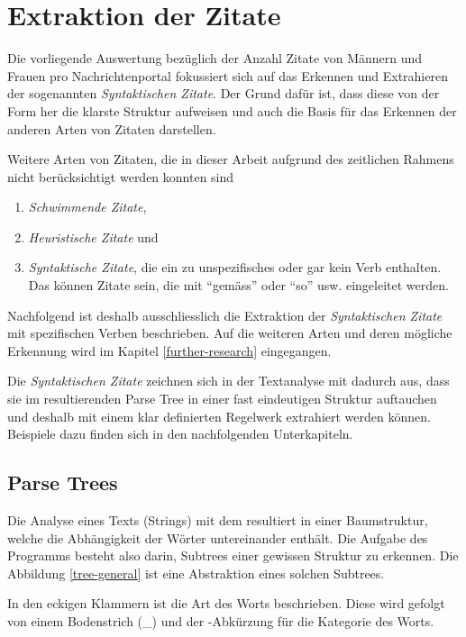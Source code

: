 \newpage
\section{Extraktion der Zitate}\label{citation-extraction}

Die vorliegende Auswertung bezüglich der Anzahl Zitate von Männern und Frauen pro Nachrichtenportal
fokussiert sich auf das Erkennen und Extrahieren der sogenannten \textsl{Syntaktischen Zitate}.
Der Grund dafür ist, dass diese von der Form her die klarste Struktur aufweisen und auch die Basis
für das Erkennen der anderen Arten von Zitaten darstellen.

Weitere Arten von Zitaten, die in dieser Arbeit aufgrund des zeitlichen Rahmens nicht berücksichtigt
werden konnten sind
\begin{enumerate}
    \item \textsl{Schwimmende Zitate},
    \item \textsl{Heuristische Zitate} und
    \item \textsl{Syntaktische Zitate}, die ein zu unspezifisches oder gar kein Verb enthalten.
Das können Zitate sein, die mit \enquote{gemäss} oder \enquote{so} usw. eingeleitet werden.
\end{enumerate}

Nachfolgend ist deshalb ausschliesslich die Extraktion der \textsl{Syntaktischen Zitate} mit spezifischen
Verben beschrieben. Auf die weiteren Arten und deren mögliche Erkennung wird im Kapitel
\ref{further-research} eingegangen.

Die \textsl{Syntaktischen Zitate} zeichnen sich in der Textanalyse mit  
dadurch aus, dass sie im resultierenden Parse Tree in einer fast eindeutigen Struktur auftauchen
und deshalb mit einem klar definierten Regelwerk extrahiert werden können. Beispiele dazu finden sich
in den nachfolgenden Unterkapiteln.

\subsection{Parse Trees}

Die Analyse eines Texts (Strings) mit dem  resultiert in einer Baumstruktur,
welche die Abhängigkeit der Wörter untereinander enthält. Die Aufgabe des Programms besteht also
darin, Subtrees einer gewissen Struktur zu erkennen. Die Abbildung \ref{tree-general} ist eine
Abstraktion eines solchen Subtrees.

In den eckigen Klammern ist die Art des Worts beschrieben. Diese wird gefolgt von einem Bodenstrich (\_)
und der  -Abkürzung für die Kategorie des Worts.



